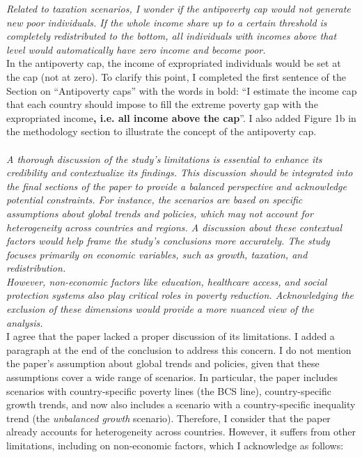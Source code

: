 \documentclass[12pt,english]{article}
\begin{document}
\textit{Related to taxation scenarios, I wonder if the antipoverty cap would not generate new poor individuals. If the whole income share up to a certain threshold is completely redistributed to the bottom, all individuals with incomes above that level would automatically have zero income and become poor. }~\\

In the antipoverty cap, the income of expropriated individuals would be set at the cap (not at zero). To clarify this point, I completed the first sentence of the Section on ``Antipoverty caps'' with the words in bold: ``I estimate the income cap that each country should impose to fill the extreme poverty gap with the expropriated income\textbf{, i.e. all income above the cap}''. I also added Figure 1b in the methodology section to illustrate the concept of the antipoverty cap.
~\\ ~\\

\textit{A thorough discussion of the study's limitations is essential to enhance its credibility and contextualize its findings. This discussion should be integrated into the final sections of the paper to provide a balanced perspective and acknowledge potential constraints. For instance, the scenarios are based on specific assumptions about global trends and policies, which may not account for heterogeneity across countries and regions. A discussion about these contextual factors would help frame the study's conclusions more accurately. The study focuses primarily on economic variables, such as growth, taxation, and redistribution. }~\\
\textit{However, non-economic factors like education, healthcare access, and social protection systems also play critical roles in poverty reduction. Acknowledging the exclusion of these dimensions would provide a more nuanced view of the analysis.}~\\

I agree that the paper lacked a proper discussion of its limitations. I added a paragraph at the end of the conclusion to address this concern. I do not mention the paper's assumption about global trends and policies, given that these assumptions cover a wide range of scenarios. In particular, the paper includes scenarios with country-specific poverty lines (the BCS line), country-specific growth trends, and now also includes a scenario with a country-specific inequality trend (the \textit{unbalanced growth} scenario). Therefore, I consider that the paper already accounts for heterogeneity across countries. However, it suffers from other limitations, including on non-economic factors, which I acknowledge as follows:  
\end{document}
